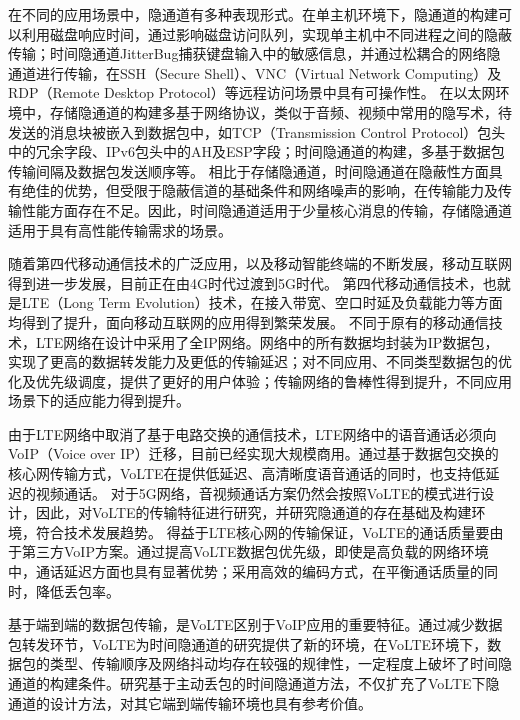 在不同的应用场景中，隐通道有多种表现形式。在单主机环境下，隐通道的构建可以利用磁盘响应时间，通过影响磁盘访问队列，实现单主机中不同进程之间的隐蔽传输；时间隐通道JitterBug捕获键盘输入中的敏感信息，并通过松耦合的网络隐通道进行传输，在SSH（Secure Shell）、VNC（Virtual Network Computing）及RDP（Remote Desktop Protocol）等远程访问场景中具有可操作性。
在以太网环境中，存储隐通道的构建多基于网络协议，类似于音频、视频中常用的隐写术，待发送的消息块被嵌入到数据包中，如TCP（Transmission Control Protocol）包头中的冗余字段、IPv6包头中的AH及ESP字段；时间隐通道的构建，多基于数据包传输间隔及数据包发送顺序等。
相比于存储隐通道，时间隐通道在隐蔽性方面具有绝佳的优势，但受限于隐蔽信道的基础条件和网络噪声的影响，在传输能力及传输性能方面存在不足。因此，时间隐通道适用于少量核心消息的传输，存储隐通道适用于具有高性能传输需求的场景。

随着第四代移动通信技术的广泛应用，以及移动智能终端的不断发展，移动互联网得到进一步发展，目前正在由4G时代过渡到5G时代。
第四代移动通信技术，也就是LTE（Long Term Evolution）技术，在接入带宽、空口时延及负载能力等方面均得到了提升，面向移动互联网的应用得到繁荣发展。
不同于原有的移动通信技术，LTE网络在设计中采用了全IP网络。网络中的所有数据均封装为IP数据包，实现了更高的数据转发能力及更低的传输延迟；对不同应用、不同类型数据包的优化及优先级调度，提供了更好的用户体验；传输网络的鲁棒性得到提升，不同应用场景下的适应能力得到提升。

由于LTE网络中取消了基于电路交换的通信技术，LTE网络中的语音通话必须向VoIP（Voice over IP）迁移，目前已经实现大规模商用。通过基于数据包交换的核心网传输方式，VoLTE在提供低延迟、高清晰度语音通话的同时，也支持低延迟的视频通话。
对于5G网络，音视频通话方案仍然会按照VoLTE的模式进行设计，因此，对VoLTE的传输特征进行研究，并研究隐通道的存在基础及构建环境，符合技术发展趋势。
得益于LTE核心网的传输保证，VoLTE的通话质量要由于第三方VoIP方案。通过提高VoLTE数据包优先级，即使是高负载的网络环境中，通话延迟方面也具有显著优势；采用高效的编码方式，在平衡通话质量的同时，降低丢包率。

基于端到端的数据包传输，是VoLTE区别于VoIP应用的重要特征。通过减少数据包转发环节，VoLTE为时间隐通道的研究提供了新的环境，在VoLTE环境下，数据包的类型、传输顺序及网络抖动均存在较强的规律性，一定程度上破坏了时间隐通道的构建条件。研究基于主动丢包的时间隐通道方法，不仅扩充了VoLTE下隐通道的设计方法，对其它端到端传输环境也具有参考价值。